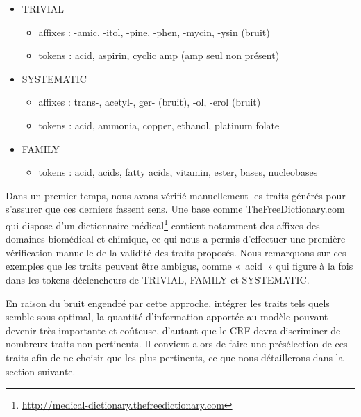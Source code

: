 \documentclass[PhD-Yoann-Dupont.tex]{subfiles}
\begin{document}
\begin{itemize}
    \item TRIVIAL
        \begin{itemize}
            \item affixes : -amic, -itol, -pine, -phen, -mycin, -ysin (bruit)
            \item tokens : acid, aspirin, cyclic amp (amp seul non présent)
        \end{itemize}
    \item SYSTEMATIC
        \begin{itemize}
            \item affixes : trans-, acetyl-, ger- (bruit), -ol, -erol (bruit)
            \item tokens : acid, ammonia, copper, ethanol, platinum folate
        \end{itemize}
    \item FAMILY
        \begin{itemize}
            \item tokens : acid, acids, fatty acids, vitamin, ester, bases, nucleobases
        \end{itemize}
\end{itemize}

Dans un premier temps, nous avons vérifié manuellement les traits générés pour s'assurer que ces derniers fassent sens. Une base comme TheFreeDictionary.com qui dispose d'un dictionnaire médical\footnote{\url{http://medical-dictionary.thefreedictionary.com}} contient notamment des affixes des domaines biomédical et chimique, ce qui nous a permis d'effectuer une première vérification manuelle de la validité des traits proposés. Nous remarquons sur ces exemples que les traits peuvent être ambigus, comme «\ acid\ » qui figure à la fois dans les tokens déclencheurs de TRIVIAL, FAMILY et SYSTEMATIC.

En raison du bruit engendré par cette approche, intégrer les traits tels quels semble sous-optimal, la quantité d'information apportée au modèle pouvant devenir très importante et coûteuse, d'autant que le CRF devra discriminer de nombreux traits non pertinents. Il convient alors de faire une présélection de ces traits afin de ne choisir que les plus pertinents, ce que nous détaillerons dans la section suivante.
\end{document}
